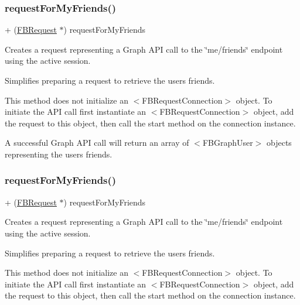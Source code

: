 \subsubsection{\texorpdfstring{request\+For\+My\+Friends()}{requestForMyFriends()}\hspace{0.1cm}{\footnotesize\ttfamily [3/5]}}
{\footnotesize\ttfamily + (\hyperlink{interfaceFBRequest}{F\+B\+Request} $\ast$) request\+For\+My\+Friends \begin{DoxyParamCaption}{ }\end{DoxyParamCaption}}

Creates a request representing a Graph A\+PI call to the \char`\"{}me/friends\char`\"{} endpoint using the active session.

Simplifies preparing a request to retrieve the user\textquotesingle{}s friends.

This method does not initialize an $<$\+F\+B\+Request\+Connection$>$ object. To initiate the A\+PI call first instantiate an $<$\+F\+B\+Request\+Connection$>$ object, add the request to this object, then call the {\ttfamily start} method on the connection instance.

A successful Graph A\+PI call will return an array of $<$\+F\+B\+Graph\+User$>$ objects representing the user\textquotesingle{}s friends. \mbox{\label{interfaceFBRequest_a95570ea8628f71b3c311da8378729cc6}} 
\subsubsection{\texorpdfstring{request\+For\+My\+Friends()}{requestForMyFriends()}\hspace{0.1cm}{\footnotesize\ttfamily [4/5]}}
{\footnotesize\ttfamily + (\hyperlink{interfaceFBRequest}{F\+B\+Request} $\ast$) request\+For\+My\+Friends \begin{DoxyParamCaption}{ }\end{DoxyParamCaption}}

Creates a request representing a Graph A\+PI call to the \char`\"{}me/friends\char`\"{} endpoint using the active session.

Simplifies preparing a request to retrieve the user\textquotesingle{}s friends.

This method does not initialize an $<$\+F\+B\+Request\+Connection$>$ object. To initiate the A\+PI call first instantiate an $<$\+F\+B\+Request\+Connection$>$ object, add the request to this object, then call the {\ttfamily start} method on the connection instance.

